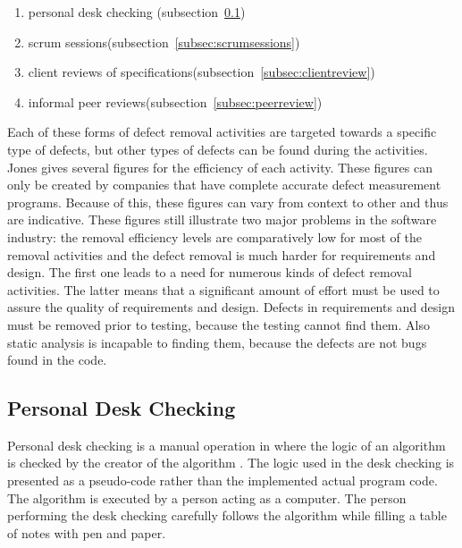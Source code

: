 \begin{enumerate}

\item personal desk checking (subsection~\ref{subsec:deskcheck})

\item scrum sessions(subsection~\ref{subsec:scrumsessions})

\item client reviews of specifications(subsection~\ref{subsec:clientreview})

\item informal peer reviews(subsection~\ref{subsec:peerreview})

\end{enumerate}

Each of these forms of defect removal activities are targeted towards a specific type of defects, but other types of defects can be found during the activities. Jones gives several figures for the efficiency of each activity. These figures can only be created by companies that have complete accurate defect measurement programs. Because of this, these figures can vary from context to other and thus are indicative. These figures still illustrate two major problems in the software industry: the removal efficiency levels are comparatively low for most of the removal activities and the defect removal is much harder for requirements and design. The first one leads to a need for numerous kinds of defect removal activities. The latter means that a significant amount of effort must be used to assure the quality of requirements and design. Defects in requirements and design must be removed prior to testing, because the testing cannot find them. Also static analysis is incapable to finding them, because the defects are not bugs found in the code.



\subsection{Personal Desk Checking} 
\label{subsec:deskcheck}
Personal desk checking is a manual operation in where the logic of an algorithm is checked by the creator of the algorithm . The logic used in the desk checking is presented as a pseudo-code rather than the implemented actual program code. The algorithm is executed by a person acting as a computer. The person performing the desk checking carefully follows the algorithm while filling a table of notes with pen and paper. 

